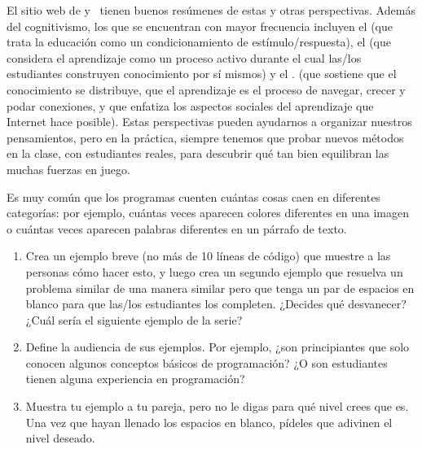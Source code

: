 El sitio web de 
y~\cite{Wibu2016}
tienen buenos resúmenes de estas y otras perspectivas.
Además del cognitivismo, los que se encuentran con mayor frecuencia incluyen el 
(que trata la educación como un condicionamiento de estímulo/respuesta),
el 
(que considera el aprendizaje como un proceso activo durante el cual las/los estudiantes construyen conocimiento por sí mismos)
y el .
(que sostiene que el conocimiento se distribuye,
que el aprendizaje es el proceso de navegar, crecer y podar conexiones,
y que enfatiza los aspectos sociales del aprendizaje que Internet hace posible).
Estas perspectivas pueden ayudarnos a organizar nuestros pensamientos,
pero en la práctica,
siempre tenemos que probar nuevos métodos en la clase,
con estudiantes reales,
para descubrir qué tan bien equilibran las muchas fuerzas en juego.



Es muy común que los programas cuenten cuántas cosas caen en diferentes categorías:
por ejemplo,
cuántas veces aparecen colores diferentes en una imagen
o cuántas veces aparecen palabras diferentes en un párrafo de texto.

\begin{enumerate}
\item
    Crea un ejemplo breve (no más de 10 líneas de código) que muestre a las personas cómo hacer esto,
    y luego crea un segundo ejemplo que resuelva un problema similar de una manera similar
    pero que tenga un par de espacios en blanco para que las/los estudiantes los completen.
    ¿Decides qué desvanecer?
    ¿Cuál sería el siguiente ejemplo de la serie?

\item
    Define la audiencia de sus ejemplos.
    Por ejemplo,
    ¿son  principiantes que solo conocen algunos conceptos básicos de programación?
    ¿O son estudiantes tienen alguna experiencia en programación?

\item
    Muestra tu ejemplo a tu pareja,
    pero no le digas para qué nivel crees que es.
    Una vez que hayan llenado los espacios en blanco,
    pídeles que adivinen el nivel deseado.

\end{enumerate}

